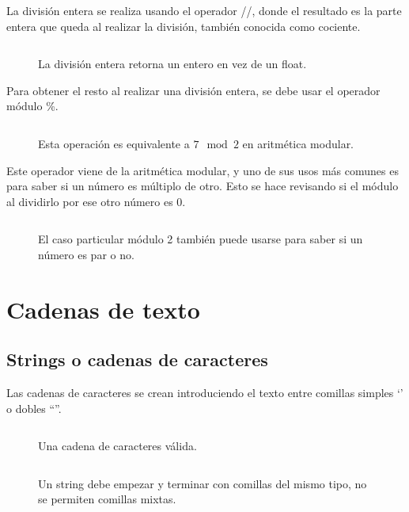 \documentclass{article}
\newcommand{\simple}[1]{`#1'}
\newcommand{\doble}[1]{``#1''}
\begin{document}
La división entera se realiza usando el operador //, donde el resultado es la parte entera que queda al realizar la división, también conocida como cociente.
  
\begin{figure}[ht!]
  \inputminted[frame=single, linenos]{python}{codigo/cap2/cociente.py}
  \caption{La división entera retorna un entero en vez de un float.}
\end{figure}

Para obtener el resto al realizar una división entera, se debe usar el operador módulo \%.

\begin{figure}[ht!]
  \inputminted[frame=single, linenos]{python}{codigo/cap2/resto.py}
  \caption{Esta operación es equivalente a $7 \mod{2}$ en aritmética modular.}
\end{figure}

Este operador viene de la aritmética modular, y uno de sus usos más comunes es para saber si un número es múltiplo de otro. Esto se hace revisando si el módulo al dividirlo por ese otro número es 0.

\begin{figure}[ht!]
  \inputminted[frame=single, linenos]{python}{codigo/cap2/uso_del_resto.py}
  \caption{El caso particular módulo 2 también puede usarse para saber si un número es par o no.}
\end{figure}

\section{Cadenas de texto}

\subsection{Strings o cadenas de caracteres}

Las cadenas de caracteres se crean introduciendo el texto entre comillas simples \simple{} o dobles \doble{}.

\begin{figure}[ht!]
  \inputminted[frame=single, linenos]{python}{codigo/cap3/string.py}
  \caption{Una cadena de caracteres válida.}
\end{figure}

\begin{figure}[ht!]
  \inputminted[frame=single, linenos]{python}{codigo/cap3/strings_no_validos.py}
  \caption{Un string debe empezar y terminar con comillas del mismo tipo, no se permiten comillas mixtas.}
\end{figure}
\end{document}
